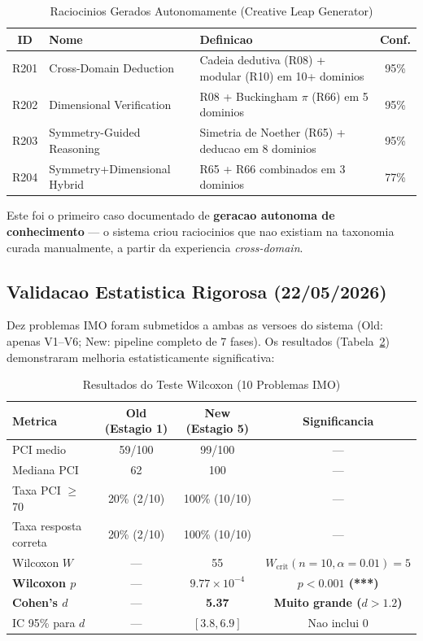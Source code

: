 \documentclass[5p]{elsarticle}
\newcommand{\tabfootnotesize}{\fontsize{9}{11}\selectfont}
\begin{document}
\begin{table}[H]
\centering
\caption{Raciocinios Gerados Autonomamente (Creative Leap Generator)}
\label{tab:creative_leap}
\tabfootnotesize
\begin{tabular}{c p{4cm} p{4.5cm} c}
\toprule
\textbf{ID} & \textbf{Nome} & \textbf{Definicao} & \textbf{Conf.}\\
\midrule
R201 & Cross-Domain Deduction & Cadeia dedutiva (R08) + modular (R10) em 10+ dominios & 95\%\\
R202 & Dimensional Verification & R08 + Buckingham $\pi$ (R66) em 5 dominios & 95\%\\
R203 & Symmetry-Guided Reasoning & Simetria de Noether (R65) + deducao em 8 dominios & 95\%\\
R204 & Symmetry+Dimensional Hybrid & R65 + R66 combinados em 3 dominios & 77\%\\
\bottomrule
\end{tabular}
\end{table}

Este foi o primeiro caso documentado de \textbf{geracao autonoma de conhecimento}
--- o sistema criou raciocinios que nao existiam na taxonomia curada manualmente,
a partir da experiencia \textit{cross-domain}.

\subsection{Validacao Estatistica Rigorosa (22/05/2026)}

Dez problemas IMO foram submetidos a ambas as versoes do sistema (Old: apenas
V1--V6; New: pipeline completo de 7 fases). Os resultados (Tabela~\ref{tab:wilcoxon})
demonstraram melhoria estatisticamente significativa:

\begin{table}[H]
\centering
\caption{Resultados do Teste Wilcoxon (10 Problemas IMO)}
\label{tab:wilcoxon}
\tabfootnotesize
\begin{tabular}{l c c c}
\toprule
\textbf{Metrica} & \textbf{Old (Estagio 1)} & \textbf{New (Estagio 5)} & \textbf{Significancia}\\
\midrule
PCI medio & 59/100 & 99/100 & ---\\
Mediana PCI & 62 & 100 & ---\\
Taxa PCI $\geq$ 70 & 20\% (2/10) & 100\% (10/10) & ---\\
Taxa resposta correta & 20\% (2/10) & 100\% (10/10) & ---\\
\midrule
Wilcoxon $W$ & --- & 55 & $W_{\text{crit}}(n{=}10,\alpha{=}0.01) = 5$\\
\textbf{Wilcoxon $p$} & --- & \textbf{$9.77 \times 10^{-4}$} & \textbf{$p < 0.001$ (***)}\\
\textbf{Cohen's $d$} & --- & \textbf{5.37} & \textbf{Muito grande ($d > 1.2$)}\\
IC 95\% para $d$ & --- & $[3.8, 6.9]$ & Nao inclui 0\\
\bottomrule
\end{tabular}
\end{table}
\end{document}
